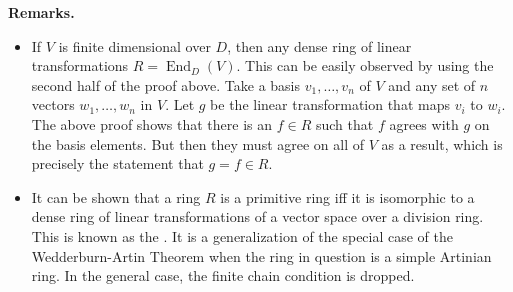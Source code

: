 \documentclass[12pt]{article}
\begin{document}
\textbf{Remarks.}
\begin{itemize}
\item If $V$ is finite dimensional over $D$, then any dense ring of linear transformations $R=\operatorname{End}_D(V)$.  This can be easily observed by using the second half of the proof above.  Take a basis $v_1,\ldots,v_n$ of $V$ and any set of $n$ vectors $w_1,\ldots,w_n$ in $V$.  Let $g$ be the linear transformation that maps $v_i$ to $w_i$.  The above proof shows that there is an $f\in R$ such that $f$ agrees with $g$ on the basis elements.  But then they must agree on all of $V$ as a result, which is precisely the statement that $g=f\in R$.
\item It can be shown that a ring $R$ is a primitive ring iff it is isomorphic to a dense ring of linear transformations of a vector space over a division ring.  This is known as the \emph{}.  It is a generalization of the special case of the Wedderburn-Artin Theorem when the ring in question is a simple Artinian ring.  In the general case, the finite chain condition is dropped.
\end{itemize}
\end{document}
